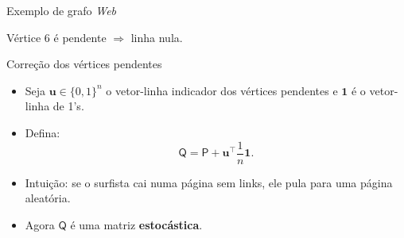 \documentclass[aspectratio=169]{beamer}
\begin{document}
\begin{frame}{Exemplo de grafo \emph{Web}}


\vspace{1ex}
\small{Vértice 6 é pendente $\Rightarrow$ linha nula.}
\end{frame}

\begin{frame}{Correção dos vértices pendentes}
  \begin{itemize}\itemsep=.6cm
  \item Seja $\bm{u}\in\{0,1\}^n$ o vetor-linha indicador dos vértices
    pendentes e \(\mathbf{1}\) é o vetor-linha de 1's.
  \item Defina:
    \[
      \mathsf{Q} = \mathsf{P} + \bm{u}^\intercal \frac{1}{n}\mathbf{1}.
    \]
  \item Intuição: se o surfista cai numa página sem links, ele pula
    para uma página aleatória.
  \item Agora $\mathsf{Q}$ é uma matriz \textbf{estocástica}.
  \end{itemize}
\end{frame}
\end{document}
